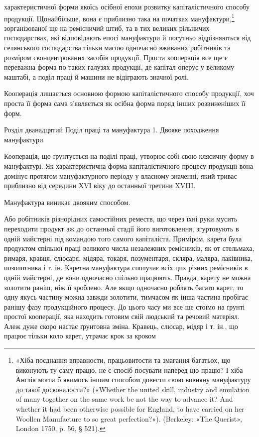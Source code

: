 \parcont{}  %
характеристичної форми якоїсь осібної епохи розвитку капіталістичного
способу продукції. Щонайбільше, вона є приблизно
така на початках мануфактури,\footnote{
«Хіба поєднання вправности, працьовитости та змагання багатьох,
що виконують ту саму працю, не є спосіб посувати наперед цю працю?
І хіба Англія могла б якимось іншим способом довести свою вовняну мануфактуру
до такої досконалости?» («Whether the united skill, industry
and emulation of many together on the same work be not the way to advance
it? And whether it had been otherwise possible for England, to have
carried on her Woollen Manufacture to so great perfection?»). (Berkeley: «The
Querist», London 1750, p. 56, § 521).
} зорганізованої ще на ремісничий
штиб, та в тих великих рільничих господарствах, які відповідають
епосі мануфактури й посутньо відрізняються від селянського
господарства тільки масою одночасно вживаних робітників
та розміром сконцентрованих засобів продукції. Проста кооперація
все ще є переважна форма по таких галузях продукції, де
капітал оперує у великому маштабі, а поділ праці й машини не
відіграють значної ролі.

Кооперація лишається основною формою капіталістичного способу
продукції, хоч проста її форма сама з’являється як осібна
форма поряд інших розвиненіших її форм.

Розділ дванадцятий
Поділ праці та мануфактура
1. Двояке походження мануфактури

Кооперація, що ґрунтується на поділі праці, утворює собі
свою клясичну форму в мануфактурі. Як характеристична форма
капіталістичного процесу продукції вона домінує протягом мануфактурного
періоду у власному значенні, який триває приблизно
від середини ХVІ віку до останньої третини XVIII.

Мануфактура виникає двояким способом.

Або робітників різнорідних самостійних реместв, що через
їхні руки мусить переходити продукт аж до останньої стадії його
виготовлення, згуртовують в одній майстерні під командою того
самого капіталіста. Приміром, карета була продуктом спільної
праці великого числа незалежних ремісників, як от стельмаха,
римаря, кравця, слюсаря, мідяра, токаря, позументаря, скляра,
маляра, лаківника, позолотника і т. ін. Каретна мануфактура
сполучає всіх цих різних ремісників в одній майстерні, де вони
одночасно спільно працюють. Правда, карету не можна золотити
раніш, ніж її зроблено. Але якщо одночасно роблять багато карет,
то одну якусь частину можна завжди золотити, тимчасом як
інша частина пробігає ранішу фазу продукційного процесу. До
цього часу ми все ще стоїмо на ґрунті простої кооперації, яка
находить готовим свій людський та речовий матеріял. Алеж
дуже скоро настає ґрунтовна зміна. Кравець, слюсар, мідяр і
т. ін., що працює тільки коло карет, утрачає крок за кроком
\parbreak{}  %
